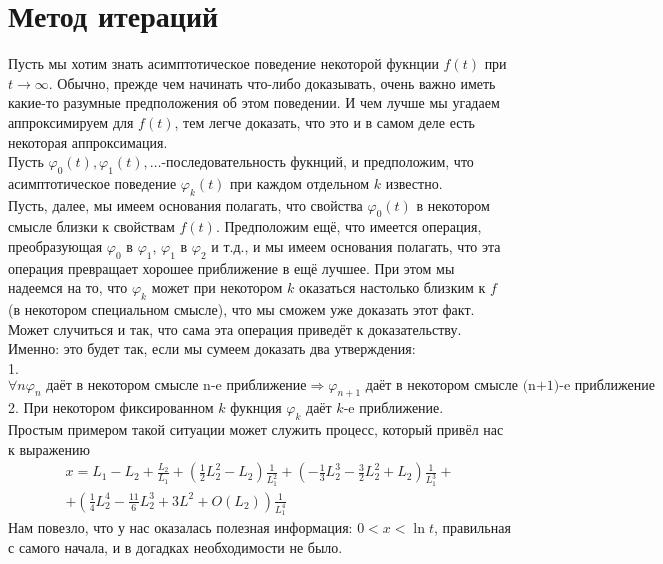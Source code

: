 \documentclass{report}
\begin{document}
\section{Метод итераций}
Пусть мы хотим знать асимптотическое поведение некоторой фукнции $f(t)$ при $t\to\infty$. Обычно, прежде чем начинать что-либо доказывать, очень важно иметь какие-то разумные предположения об этом поведении.
И чем лучше мы угадаем аппроксимируем для $f(t)$, тем легче доказать, что это и в самом деле есть некоторая аппроксимация. \\
Пусть $\varphi_0(t),\varphi_1(t),\dots$-последовательность фукнций, и предположим, что асимптотическое поведение $\varphi_k(t)$ при каждом отдельном $k$ известно. \\
Пусть, далее, мы имеем основания полагать, что свойства $\varphi_0(t)$ в некотором смысле близки к свойствам $f(t)$. Предположим ещё, что имеется операция, преобразующая $\varphi_0$ в $\varphi_1$,
$\varphi_1$ в $\varphi_2$ и т.д., и мы имеем основания полагать, что эта операция превращает хорошее приближение в ещё лучшее. При этом мы надеемся на то, что $\varphi_k$ может при некотором $k$ оказаться
настолько близким к $f$ (в некотором специальном смысле), что мы сможем уже доказать этот факт. Может случиться и так, что сама эта операция приведёт к доказательству.\\
Именно: это будет так, если мы сумеем доказать два утверждения: \\
1. $\forall{n}\varphi_n\textrm{ даёт в некотором смысле n-e приближение}\Rightarrow\varphi_{n+1}\textrm{ даёт в некотором смысле (n+1)-e приближение}$ \\
2. При некотором фиксированном $k$ фукнция $\varphi_k$ даёт $k$-e приближение. \\
Простым примером такой ситуации может служить процесс, который привёл нас к выражению \\
\begin{multline}
    x=L_1-L_2+\frac{L_2}{L_1}+\left(\frac{1}{2}L_2^{2}-L_2\right)\frac{1}{L_1^{2}}+\left(-\frac{1}{3}L_2^{3}-\frac{3}{2}L_2^{2}+L_2\right)\frac{1}{L_1^{3}}+\\
    +\left(\frac{1}{4}L_2^{4}-\frac{11}{6}L_2^{3}+3L^{2}+O(L_2)\right)\frac{1}{L_1^{4}}
\end{multline}
Нам повезло, что у нас оказалась полезная информация: $0<x<\ln{t}$, правильная с самого начала, и в догадках необходимости не было.
\newpage
\end{document}
